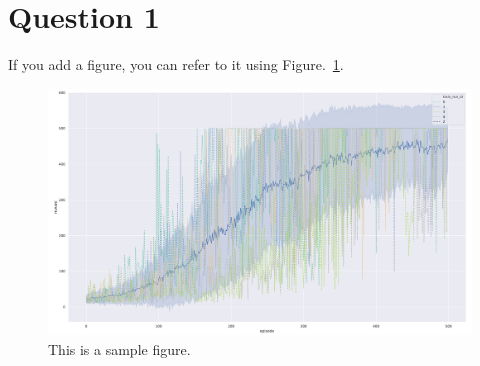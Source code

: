 \documentclass[12pt]{article}
\begin{document}
\section{Question 1}

If you add a figure, you can refer to it using Figure.~\ref*{fig:fig1}.

\begin{figure}[h] 
	\centering  %
    \includegraphics[width=0.3\columnwidth]{img/training.pdf}
	\caption{This is a sample figure.}
	\label{fig:fig1}
\end{figure}


\end{document}
